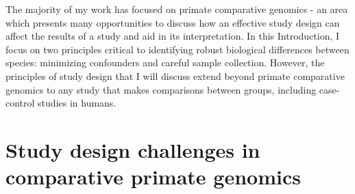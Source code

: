 The majority of my work has focused on primate comparative genomics - an area which presents many opportunities to discuss how an effective study design can affect the results of a study and aid in its interpretation. In this Introduction, I focus on two principles critical to identifying robust biological differences between species: minimizing confounders and careful sample collection. However, the principles of study design that I will discuss extend beyond primate comparative genomics to any study that makes comparisons between groups, including case-control studies in humans.

\section{Study design challenges in comparative primate genomics}

